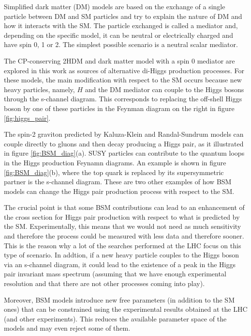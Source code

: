 Simplified dark matter (DM) models are based on the exchange of a single particle between DM and SM particles and try to explain the nature of DM and how it interacts with the SM. The particle exchanged is called a mediator and, depending on the specific model, it can be neutral or electrically charged and have spin 0, 1 or 2. The simplest possible scenario is a neutral scalar mediator.

The CP-conserving 2HDM and dark matter model with a spin 0 mediator are explored in this work as sources of alternative di-Higgs production processes. For these models, the main modification with respect to the SM occurs because new heavy particles, namely, $H$ and the DM mediator can couple to the Higgs bosons through the s-channel diagram. This corresponds to replacing the off-shell Higgs boson by one of these particles in the Feynman diagram on the right in figure \ref{fig:higgs_pair}.

The spin-2 graviton predicted by Kaluza-Klein and Randal-Sundrum models can couple directly to gluons and then decay producing a Higgs pair, as it illustrated in figure \ref{fig:BSM_diag}(a). SUSY particles can contribute to the quantum loops in the Higgs production Feynamn diagrams. An example is shown in figure \ref{fig:BSM_diag}(b), where the top quark is replaced by its supersymmetric partner is the s-channel diagram. These are two other examples of how BSM models can change the Higgs pair production process with respect to the SM. 

The crucial point is that some BSM contributions can lead to an enhancement of the cross section for Higgs pair production with respect to what is predicted by the SM. Experimentally, this means that we would not need as much sensitivity and therefore the process could be measured with less data and therefore sooner. This is the reason why a lot of the searches performed at the LHC focus on this type of scenario. In addtion, if a new heavy particle couples to the Higgs boson via an s-channel diagram, it could lead to the existence of a peak in the Higgs pair invariant mass spectrum (assuming that we have enough experimental resolution and that there are not other processes coming into play). 

Moreover, BSM models introduce new free parameters (in addition to the SM ones) that can be constrained using the experimental results obtained at the LHC (and other experiments). This reduces the available parameter space of the models and may even reject some of them.

